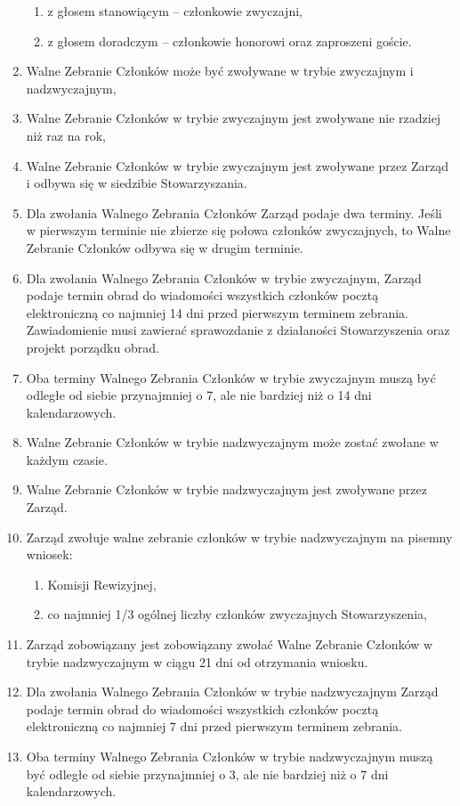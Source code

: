 \documentclass{article}
\begin{document}
\begin{enumerate}
\begin{enumerate}
	            \item z głosem stanowiącym – członkowie zwyczajni,
	            \item z głosem doradczym – członkowie honorowi oraz zaproszeni goście.
	          \end{enumerate}
	        \item Walne Zebranie Członków może być zwoływane w trybie zwyczajnym i nadzwyczajnym,
	        \item Walne Zebranie Członków w trybie zwyczajnym jest zwoływane nie rzadziej niż raz na rok,
	        \item Walne Zebranie Członków w trybie zwyczajnym jest zwoływane przez Zarząd i odbywa się w siedzibie Stowarzyszania.
	    \item Dla zwołania Walnego Zebrania Członków Zarząd podaje dwa terminy. Jeśli w pierwszym terminie nie zbierze się połowa członków zwyczajnych, to Walne Zebranie Członków odbywa się w drugim terminie.
	    \item Dla zwołania Walnego Zebrania Członków w trybie zwyczajnym, Zarząd podaje termin obrad do wiadomości wszystkich członków pocztą elektroniczną co najmniej 14 dni przed pierwszym terminem zebrania. Zawiadomienie musi zawierać sprawozdanie z działaności Stowarzyszenia oraz projekt porządku obrad.
	    \item Oba terminy Walnego Zebrania Członków w trybie zwyczajnym muszą być odległe od siebie przynajmniej o 7, ale nie bardziej niż o 14 dni kalendarzowych.
	    \item Walne Zebranie Członków w trybie nadzwyczajnym może zostać zwołane w każdym czasie.
	    \item Walne Zebranie Członków w trybie nadzwyczajnym jest zwoływane przez Zarząd.
	    \item Zarząd zwołuje walne zebranie członków w trybie nadzwyczajnym na pisemny wniosek:
	      \begin{enumerate}
	        \item Komisji Rewizyjnej,
	        \item co najmniej 1/3 ogólnej liczby członków zwyczajnych Stowarzyszenia,
	        \end{enumerate}
	    \item Zarząd zobowiązany jest zobowiązany zwołać Walne Zebranie Członków w trybie nadzwyczajnym w ciągu 21 dni od otrzymania wniosku.
	    \item Dla zwołania Walnego Zebrania Członków w trybie nadzwyczajnym Zarząd podaje termin obrad do wiadomości wszystkich członków pocztą elektroniczną co najmniej 7 dni przed pierwszym terminem zebrania.
	    \item Oba terminy Walnego Zebrania Członków w trybie nadzwyczajnym muszą być odległe od siebie przynajmniej o 3, ale nie bardziej niż o 7 dni kalendarzowych.

\end{enumerate}
\end{document}
